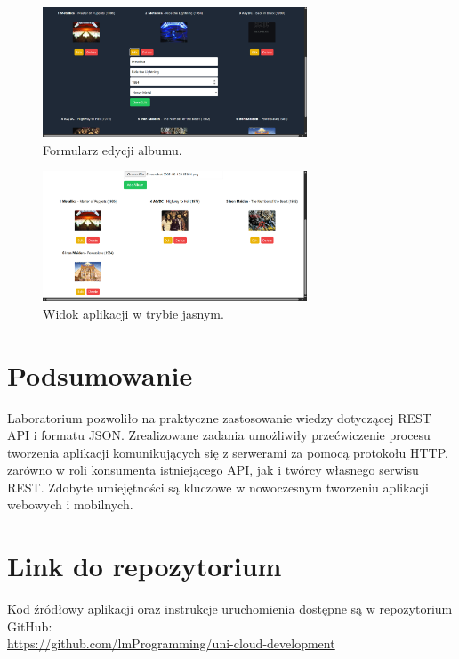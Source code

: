 \documentclass[11pt, a4paper]{article}
\begin{document}
\begin{figure}[H]
    \centering
    \includegraphics[width=0.7\textwidth]{album-edit.png}
    \caption{Formularz edycji albumu.}
\end{figure}

\begin{figure}[H]
    \centering
    \includegraphics[width=0.7\textwidth]{album-light.png}
    \caption{Widok aplikacji w trybie jasnym.}
\end{figure}

\section{Podsumowanie}
Laboratorium pozwoliło na praktyczne zastosowanie wiedzy dotyczącej REST API i formatu JSON. Zrealizowane zadania umożliwiły przećwiczenie procesu tworzenia aplikacji komunikujących się z serwerami za pomocą protokołu HTTP, zarówno w roli konsumenta istniejącego API, jak i twórcy własnego serwisu REST. Zdobyte umiejętności są kluczowe w nowoczesnym tworzeniu aplikacji webowych i mobilnych.

\section{Link do repozytorium}
Kod źródłowy aplikacji oraz instrukcje uruchomienia dostępne są w repozytorium GitHub: \\
\url{https://github.com/lmProgramming/uni-cloud-development}
\end{document}
